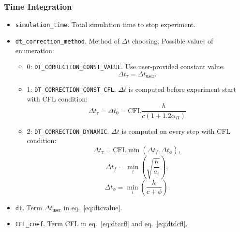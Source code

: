 \subsubsection{Time Integration}
\begin{itemize}
    \item \verb|simulation_time|. Total simulation time to stop experiment.
    \item \verb|dt_correction_method|. Method of $\Delta t$ choosing. Possible values of enumeration:
    \begin{itemize}
        \item 0: \verb|DT_CORRECTION_CONST_VALUE|. Use user-provided constant value.
        \begin{equation}\label{eq:dtcvalue}
            \Delta t_{\tau} = \Delta t_{\text{user}}.
        \end{equation}
        \item 1: \verb|DT_CORRECTION_CONST_CFL|. $\Delta t$ is computed before experiment start with CFL condition:
        \begin{equation}\label{eq:dtccfl}
            \Delta t_{\tau} = \Delta t_{0} = 
            \text{CFL} \frac{h}{c (1 + 1.2\alpha_{\Pi})}
        \end{equation}
        \item 2: \verb|DT_CORRECTION_DYNAMIC|. $\Delta t$ is computed on every step with CFL condition:
        \begin{equation}\label{eq:dtdcfl}
            \Delta t_{\tau} = \text{CFL}\min(\Delta t_{f}, \Delta t_{\phi}),
        \end{equation}
        \begin{equation}
            \Delta t_{f} = \min\limits_{i}
            \left(
            \sqrt{\frac{h}{a_{i}}}
            \right),
        \end{equation}
        \begin{equation}
            \Delta t_{\phi} = \min\limits_{i}
            \left(
            \frac{h}{c + \phi}
            \right).
        \end{equation}
    \end{itemize}

    \item \verb|dt|. Term $\Delta t_{\text{user}}$ in eq.~\ref{eq:dtcvalue}.
    \item \verb|CFL_coef|. Term CFL in eq.~\ref{eq:dtccfl} and eq.~\ref{eq:dtdcfl}.
\end{itemize}

